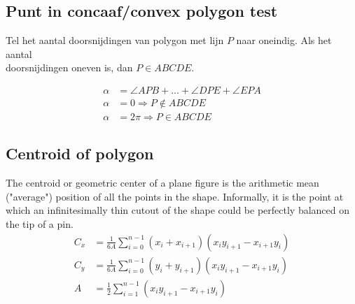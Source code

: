 \documentclass[a4paper, twocolumn]{article}
\newcommand{\point}[4]{\draw[fill] (#1,#2) circle (1pt) node[#4] {#3}}
\begin{document}
\subsection*{Punt in concaaf/convex polygon test}
Tel het aantal doorsnijdingen van polygon met lijn $P$ naar oneindig. Als het
aantal \\ doorsnijdingen oneven is, dan $P \in ABCDE$. \\
\begin{minipage}{.45\linewidth}
	\begin{align*}
	\alpha &= \angle APB + ... + \angle DPE + \angle EPA \\
	\alpha &= 0 \Rightarrow P \notin ABCDE \\
	\alpha &= 2\pi \Rightarrow P \in ABCDE
	\end{align*}
\end{minipage}\hfill%
\begin{minipage}{.5\linewidth}
	\centering
\end{minipage}

\vspace{-2.1em}
\subsection*{Centroid of polygon} \vspace{-0.3em}
The centroid or geometric center of a plane figure is the arithmetic mean
("average") position of all the points in the shape. Informally, it is the point
at which an infinitesimally thin cutout of the shape could be perfectly balanced
on the tip of a pin.
\vspace{-0.5em}
\begin{align*}
C_x &= \frac{1}{6A}\sum_{i=0}^{n-1}(x_i+x_{i+1})(x_iy_{i+1}-x_{i+1}y_i) \\
C_y &= \frac{1}{6A}\sum_{i=0}^{n-1}(y_i+y_{i+1})(x_iy_{i+1}-x_{i+1}y_i) \\
A   &= \frac{1}{2}\sum_{i=1}^{n-1}(x_iy_{i+1}-x_{i+1}y_i)
\end{align*}
\end{document}
